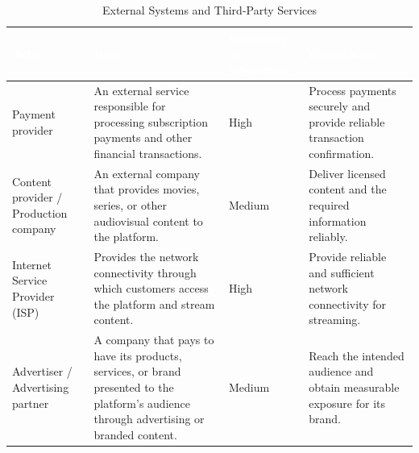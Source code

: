 \documentclass{article}
\begin{document}
\begin{table}[H]

\centering

\small

\renewcommand{\arraystretch}{1.35}

\caption{External Systems and Third-Party Services}

\label{tab:external_systems}

\begin{tabularx}{\textwidth}{|p{2.8cm}|X|p{2.8cm}|X|}

\hline

\rowcolor[HTML]{1F2937}

\textcolor{white}{\textbf{Actor}} &
\textcolor{white}{\textbf{Role}} &
\textcolor{white}{\textbf{Frequency of interaction}} &
\textcolor{white}{\textbf{Expectation}} \\

\hline

Payment provider
&
An external service responsible for processing subscription payments and other financial transactions.
&
High
&
Process payments securely and provide reliable transaction confirmation.

\\

\hline

Content provider / Production company
&
An external company that provides movies, series, or other audiovisual content to the platform.
&
Medium
&
Deliver licensed content and the required information reliably.

\\

\hline

Internet Service Provider (ISP)
&
Provides the network connectivity through which customers access the platform and stream content.
&
High
&
Provide reliable and sufficient network connectivity for streaming.

\\

\hline

Advertiser / Advertising partner
&
A company that pays to have its products, services, or brand presented to the platform's audience through advertising or branded content.
&
Medium
&
Reach the intended audience and obtain measurable exposure for its brand.

\\

\hline

\end{tabularx}

\end{table}
\end{document}
